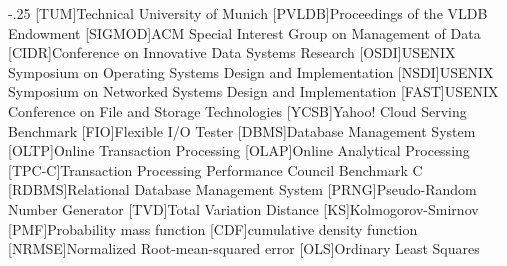 \documentclass[headsepline,footsepline,footinclude=false,oneside,fontsize=11pt,paper=a4,listof=totoc,bibliography=totoc]{scrbook} %
\begin{document}


\frontmatter{}




\tableofcontents{}

\mainmatter{}








\appendix{}


\begin{acronym}
	\itemsep-.25\baselineskip
	[TUM]{Technical University of Munich}
	[PVLDB]{Proceedings of the VLDB Endowment}
	[SIGMOD]{ACM Special Interest Group on Management of Data}
	[CIDR]{Conference on Innovative Data Systems Research}
	[OSDI]{USENIX Symposium on Operating Systems Design and Implementation}
	[NSDI]{USENIX Symposium on Networked Systems Design and Implementation}
	[FAST]{USENIX Conference on File and Storage Technologies}
	[YCSB]{Yahoo! Cloud Serving Benchmark}
	[FIO]{Flexible I/O Tester}
	[DBMS]{Database Management System}
	[OLTP]{Online Transaction Processing}
	[OLAP]{Online Analytical Processing}
	[TPC-C]{Transaction Processing Performance Council Benchmark C}
	[RDBMS]{Relational Database Management System}
	[PRNG]{Pseudo-Random Number Generator}
	[TVD]{Total Variation Distance}
	[KS]{Kolmogorov-Smirnov}
    [PMF]{Probability mass function}
    [CDF]{cumulative density function}
    [NRMSE]{Normalized Root-mean-squared error}
    [OLS]{Ordinary Least Squares}
\end{acronym}

\listoffigures{}
\listoftables{}
\printbibliography{}
\end{document}
